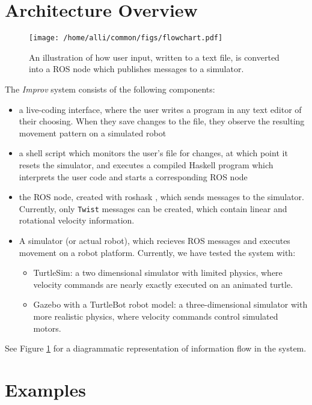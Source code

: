 \documentclass[sigconf]{acmart}
\begin{document}
\section{Architecture Overview}\label{architecture-overview}

\begin{figure}[h]
\centering
\texttt{[image: /home/alli/common/figs/flowchart.pdf]}
\caption{An illustration of how user input, written to a text file, is
converted into a ROS node which publishes messages to a simulator.
\label{flowchart}}
\end{figure}

The \emph{Improv} system consists of the following components:

\begin{itemize}
\item
  a live-coding interface, where the user writes a program in any text
  editor of their choosing. When they save changes to the file, they
  observe the resulting movement pattern on a simulated robot
\item
  a shell script which monitors the user's file for changes, at which
  point it resets the simulator, and executes a compiled Haskell program
  which interprets the user code and starts a corresponding ROS node
\item
  the ROS node, created with roshask \cite{cowley2011stream}, which sends messages to
  the simulator. Currently, only \texttt{Twist} messages can be created,
  which contain linear and rotational velocity information.
\item
  A simulator (or actual robot), which recieves ROS messages and
  executes movement on a robot platform. Currently, we have tested the
  system with:
  \begin{itemize}
  \item
    TurtleSim: a two dimensional simulator with limited physics, where
    velocity commands are nearly exactly executed on an animated turtle.
  \item
    Gazebo with a TurtleBot robot model: a three-dimensional simulator
    with more realistic physics, where velocity commands control
    simulated motors.
  \end{itemize}
\end{itemize}

See Figure \ref{flowchart} for a diagrammatic representation of
information flow in the system.


\section{Examples}\label{example-programs}
\end{document}
